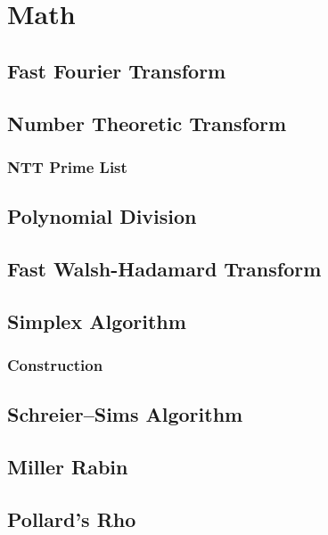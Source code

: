 \documentclass[a4paper,10pt,twocolumn,oneside]{article}
\begin{document}
\section{Math}
\subsection{Fast Fourier Transform}

\subsection{Number Theoretic Transform}

\subsubsection{NTT Prime List}

\subsection{Polynomial Division}

\subsection{Fast Walsh-Hadamard Transform}
% 

\subsection{Simplex Algorithm}

\subsubsection{Construction}

\subsection{Schreier–Sims Algorithm}

% 
\subsection{Miller Rabin}

\subsection{Pollard's Rho}

\end{document}
